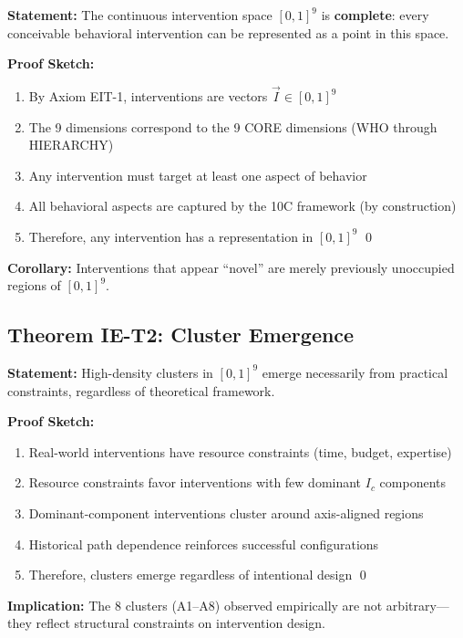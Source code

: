 \begin{tcolorbox}[colback=green!5!white, colframe=green!75!black,
    title=\textbf{Theorem IE-T1: Intervention Space Completeness}]

\textbf{Statement:} The continuous intervention space $[0,1]^9$ is \textbf{complete}: every conceivable behavioral intervention can be represented as a point in this space.

\textbf{Proof Sketch:}
\begin{enumerate}[nosep]
    \item By Axiom EIT-1, interventions are vectors $\vec{I} \in [0,1]^9$
    \item The 9 dimensions correspond to the 9 CORE dimensions (WHO through HIERARCHY)
    \item Any intervention must target at least one aspect of behavior
    \item All behavioral aspects are captured by the 10C framework (by construction)
    \item Therefore, any intervention has a representation in $[0,1]^9$ \qed
\end{enumerate}

\textbf{Corollary:} Interventions that appear ``novel'' are merely previously unoccupied regions of $[0,1]^9$.

\end{tcolorbox}

\subsection{Theorem IE-T2: Cluster Emergence}

\begin{tcolorbox}[colback=green!5!white, colframe=green!75!black,
    title=\textbf{Theorem IE-T2: Cluster Emergence from Practice}]

\textbf{Statement:} High-density clusters in $[0,1]^9$ emerge necessarily from practical constraints, regardless of theoretical framework.

\textbf{Proof Sketch:}
\begin{enumerate}[nosep]
    \item Real-world interventions have resource constraints (time, budget, expertise)
    \item Resource constraints favor interventions with few dominant $I_c$ components
    \item Dominant-component interventions cluster around axis-aligned regions
    \item Historical path dependence reinforces successful configurations
    \item Therefore, clusters emerge regardless of intentional design \qed
\end{enumerate}

\textbf{Implication:} The 8 clusters (A1--A8) observed empirically are not arbitrary---they reflect structural constraints on intervention design.

\end{tcolorbox}

